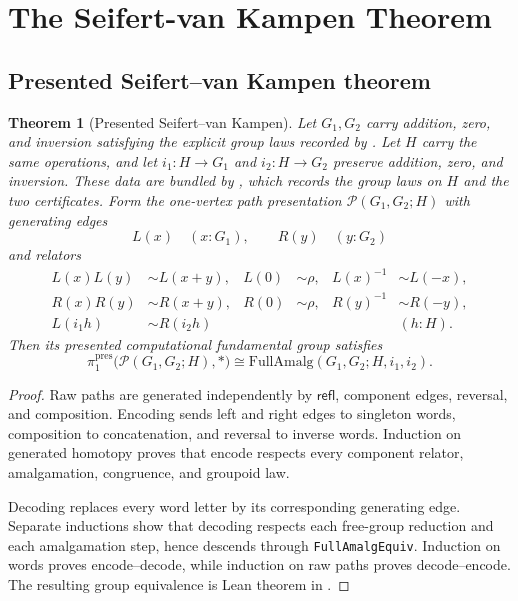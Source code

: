 \documentclass{lmcs}
\theoremstyle{definition}
\theoremstyle{plain}
\newtheorem{theorem}[definition]{Theorem}
\theoremstyle{remark}
\newcommand{\refl}{\rho}
\newcommand{\piOne}{\pi_1}
\begin{document}
\section{The Seifert-van Kampen Theorem}
\label{sec:svk}

\subsection{Presented Seifert--van Kampen theorem}

\begin{theorem}[Presented Seifert--van Kampen]
\label{thm:svk}
Let \(G_1,G_2\) carry addition, zero, and inversion satisfying the explicit
group laws recorded by .  Let \(H\) carry the same operations,
and let \(i_1:H\to G_1\) and \(i_2:H\to G_2\) preserve addition, zero, and
inversion.  These data are bundled by , which records
the group laws on \(H\) and the two  certificates.
Form the one-vertex path presentation
\(\mathcal P(G_1,G_2;H)\) with generating edges
\[
L(x)\quad(x:G_1),\qquad R(y)\quad(y:G_2)
\]
and relators
\[
\begin{aligned}
L(x)L(y)&\sim L(x+y), & L(0)&\sim\refl,
&L(x)^{-1}&\sim L(-x),\\
R(x)R(y)&\sim R(x+y), & R(0)&\sim\refl,
&R(y)^{-1}&\sim R(-y),\\
L(i_1h)&\sim R(i_2h)&&&&(h:H).
\end{aligned}
\]
Then its presented computational fundamental group satisfies
\[
\piOne^{\mathrm{pres}}\bigl(\mathcal P(G_1,G_2;H),*\bigr)
\cong
\mathrm{FullAmalg}(G_1,G_2;H,i_1,i_2).
\]
\end{theorem}

\begin{proof}
Raw paths are generated independently by
\(\mathsf{refl}\), component edges, reversal, and composition.  Encoding sends
left and right edges to singleton words, composition to concatenation, and
reversal to inverse words.  Induction on generated homotopy proves that encode
respects every component relator, amalgamation, congruence, and groupoid law.

Decoding replaces every word letter by its corresponding generating edge.
Separate inductions show that decoding respects each free-group reduction and
each amalgamation step, hence descends through
\texttt{FullAmalgEquiv}.  Induction on words proves encode--decode, while
induction on raw paths proves decode--encode.  The resulting group equivalence
is Lean theorem  in
.
\end{proof}
\end{document}
